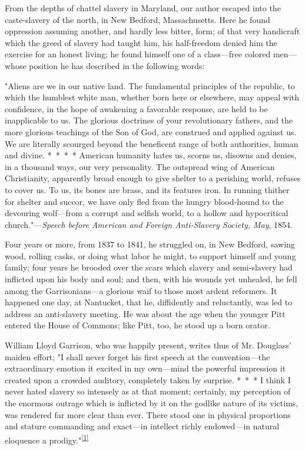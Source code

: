 From the depths of chattel slavery in Maryland, our author escaped into
the caste-slavery of the north, in New Bedford, Massachusetts. Here he
found oppression assuming another, and hardly less bitter, form; of that
very handicraft which the greed of slavery had taught him, his
half-freedom denied him the exercise for an honest living; he found
himself one of a class---free colored men---whose position he has
described in the following words:

"Aliens are we in our native land. The fundamental principles of the
republic, to which the humblest white man, whether born here or
elsewhere, may appeal with confidence, in the hope of
{\protect\hypertarget{xxi}{}{}}awakening a favorable response, are held
to be inapplicable to us. The glorious doctrines of your revolutionary
fathers, and the more glorious teachings of the Son of God, are
construed and applied against us. We are literally scourged beyond the
beneficent range of both authorities, human and divine. {*~*~*~*}
American humanity hates us, scorns us, disowns and denies, in a thousand
ways, our very personality. The outspread wing of American Christianity,
apparently broad enough to give shelter to a perishing world, refuses to
cover us. To us, its bones are brass, and its features iron. In running
thither for shelter and succor, we have only fled from the hungry
blood-hound to the devouring wolf---from a corrupt and selfish world, to
a hollow and hypocritical church."---\emph{Speech before American and
Foreign Anti-Slavery Society, May}, 1854.

Four years or more, from 1837 to 1841, he struggled on, in New Bedford,
sawing wood, rolling casks, or doing what labor he might, to support
himself and young family; four years he brooded over the scars which
slavery and semi-slavery had inflicted upon his body and soul; and then,
with his wounds yet unhealed, he fell among the Garrisonians---a
glorious waif to those most ardent reformers. It happened one day, at
Nantucket, that he, diffidently and reluctantly, was led to address an
anti-slavery meeting. He was about the age when the younger Pitt entered
the House of Commons; like Pitt, too, he stood up a born orator.

William Lloyd Garrison, who was happily present, writes thus of Mr.
Douglass' maiden effort; "I shall never forget his first speech at the
convention---the extraordinary emotion it excited in my own---mind the
powerful impression it created upon a crowded auditory, completely taken
by surprise. {*~*~*} I think I never hated slavery so intensely as at
that moment; certainly, my perception of the enormous outrage which is
inflicted by it on the godlike nature of its victims, was rendered far
more clear than ever. There stood one in physical proportions and
stature commanding and exact---in intellect richly endowed---in natural
eloquence a
prodigy."\textsuperscript{\protect\hyperlink{cite_note-1}{{[}1{]}}}

